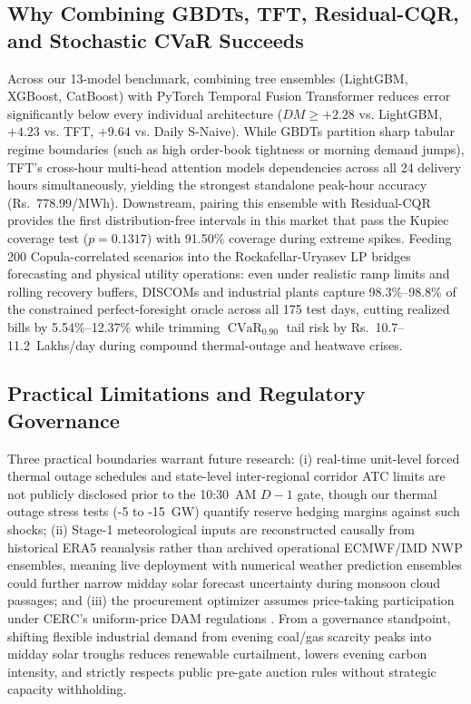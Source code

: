 \documentclass[runningheads,a4paper]{llncs}
\begin{document}
\subsection{Why Combining GBDTs, TFT, Residual-CQR, and Stochastic CVaR Succeeds}
Across our 13-model benchmark, combining tree ensembles (LightGBM, XGBoost, CatBoost) with PyTorch Temporal Fusion Transformer reduces error significantly below every individual architecture ($DM \ge +2.28$ vs. LightGBM, $+4.23$ vs. TFT, $+9.64$ vs. Daily S-Naive). While GBDTs partition sharp tabular regime boundaries (such as high order-book tightness or morning demand jumps), TFT's cross-hour multi-head attention models dependencies across all 24 delivery hours simultaneously, yielding the strongest standalone peak-hour accuracy (Rs.~778.99/MWh). Downstream, pairing this ensemble with Residual-CQR provides the first distribution-free intervals in this market that pass the Kupiec coverage test ($p=0.1317$) with 91.50\% coverage during extreme spikes. Feeding 200 Copula-correlated scenarios into the Rockafellar-Uryasev LP bridges forecasting and physical utility operations: even under realistic ramp limits and rolling recovery buffers, DISCOMs and industrial plants capture 98.3\%--98.8\% of the constrained perfect-foresight oracle across all 175 test days, cutting realized bills by 5.54\%--12.37\% while trimming $\operatorname{CVaR}_{0.90}$ tail risk by Rs.~10.7--11.2~Lakhs/day during compound thermal-outage and heatwave crises.

\subsection{Practical Limitations and Regulatory Governance}
Three practical boundaries warrant future research: (i) real-time unit-level forced thermal outage schedules and state-level inter-regional corridor ATC limits are not publicly disclosed prior to the 10:30~AM $D-1$ gate, though our thermal outage stress tests (-5 to -15~GW) quantify reserve hedging margins against such shocks; (ii) Stage-1 meteorological inputs are reconstructed causally from historical ERA5 reanalysis rather than archived operational ECMWF/IMD NWP ensembles, meaning live deployment with numerical weather prediction ensembles could further narrow midday solar forecast uncertainty during monsoon cloud passages; and (iii) the procurement optimizer assumes price-taking participation under CERC's uniform-price DAM regulations \cite{cerc2023order}. From a governance standpoint, shifting flexible industrial demand from evening coal/gas scarcity peaks into midday solar troughs reduces renewable curtailment, lowers evening carbon intensity, and strictly respects public pre-gate auction rules without strategic capacity withholding.
\end{document}
